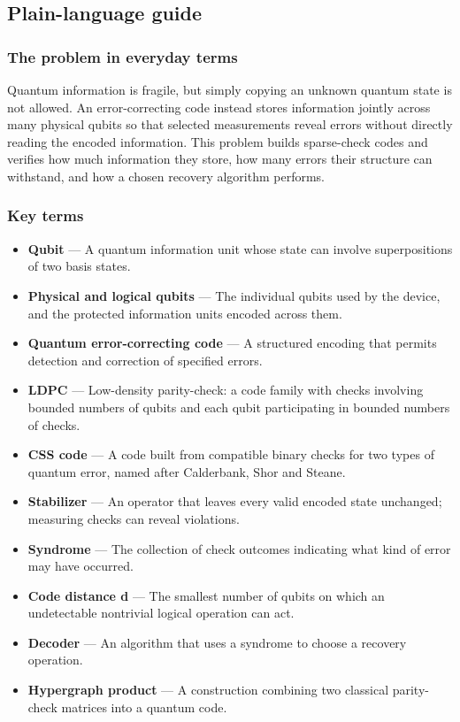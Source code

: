 \documentclass[
  11pt,
]{article}
\begin{document}
\subsection{Plain-language guide}

\subsubsection{The problem in everyday terms}

Quantum information is fragile, but simply copying an unknown quantum
state is not allowed. An error-correcting code instead stores
information jointly across many physical qubits so that selected
measurements reveal errors without directly reading the encoded
information. This problem builds sparse-check codes and verifies how
much information they store, how many errors their structure can
withstand, and how a chosen recovery algorithm performs.

\subsubsection{Key terms}

\begin{itemize}
\item
  \textbf{Qubit} --- A quantum information unit whose state can involve
  superpositions of two basis states.
\item
  \textbf{Physical and logical qubits} --- The individual qubits used by
  the device, and the protected information units encoded across them.
\item
  \textbf{Quantum error-correcting code} --- A structured encoding that
  permits detection and correction of specified errors.
\item
  \textbf{LDPC} --- Low-density parity-check: a code family with checks
  involving bounded numbers of qubits and each qubit participating in
  bounded numbers of checks.
\item
  \textbf{CSS code} --- A code built from compatible binary checks for
  two types of quantum error, named after Calderbank, Shor and Steane.
\item
  \textbf{Stabilizer} --- An operator that leaves every valid encoded
  state unchanged; measuring checks can reveal violations.
\item
  \textbf{Syndrome} --- The collection of check outcomes indicating what
  kind of error may have occurred.
\item
  \textbf{Code distance d} --- The smallest number of qubits on which an
  undetectable nontrivial logical operation can act.
\item
  \textbf{Decoder} --- An algorithm that uses a syndrome to choose a
  recovery operation.
\item
  \textbf{Hypergraph product} --- A construction combining two classical
  parity-check matrices into a quantum code.
\end{itemize}
\end{document}

